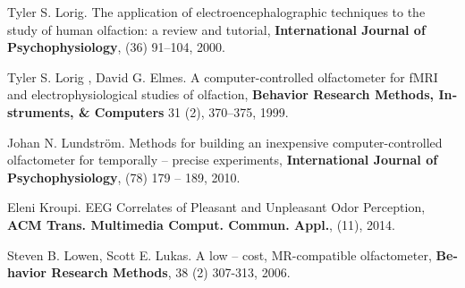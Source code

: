 \documentclass[oneside]{report}
\begin{document}
\begin{thebibliography}{9}
\begin{latin}


 Tyler S. Lorig. \textrm{The application of electroencephalographic techniques to the study of human olfaction: a review and tutorial}, \textbf{International Journal of Psychophysiology},  (36)  91–104, 2000.

Tyler S. Lorig , David G. Elmes. \textrm{A computer-controlled olfactometer for fMRI and electrophysiological studies of olfaction}, \textbf{Behavior Research Methods, Instruments, \& Computers} 31 (2), 370–375, 1999.

Johan N. Lundström. \textrm{Methods for building an inexpensive computer-controlled olfactometer for temporally – precise experiments}, \textbf{International Journal of Psychophysiology},  (78) 179 – 189, 2010.

Eleni Kroupi.  \textrm{EEG Correlates of Pleasant and Unpleasant Odor Perception},  \textbf{ACM Trans. Multimedia Comput. Commun. Appl.}, (11), 2014.

Steven B. Lowen, Scott E. Lukas. \textrm{A low – cost, MR-compatible olfactometer},  \textbf{Behavior Research Methods}, 38 (2) 307-313, 2006. 

\end{latin}
\end{thebibliography}
\newpage
  \thispagestyle{empty} 
  \setcounter{footnote}{0} 
 
\end{document}
